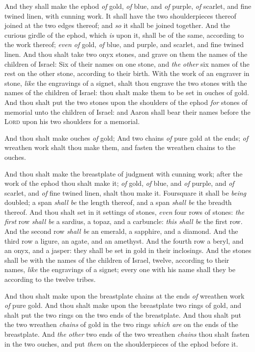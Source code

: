 \documentclass[11pt,letterpaper,oneside]{memoir}
\begin{document}
And they shall make the ephod \emph{of} gold, \emph{of} blue, and
\emph{of} purple, \emph{of} scarlet, and fine twined linen, with cunning
work. It shall have the two shoulderpieces thereof joined at the two
edges thereof; and \emph{so} it shall be joined together. And the
curious girdle of the ephod, which \emph{is} upon it, shall be of the
same, according to the work thereof; \emph{even of} gold, \emph{of}
blue, and purple, and scarlet, and fine twined linen. And thou shalt
take two onyx stones, and grave on them the names of the children of
Israel: Six of their names on one stone, and \emph{the other} six names
of the rest on the other stone, according to their birth. With the work
of an engraver in stone, \emph{like} the engravings of a signet, shalt
thou engrave the two stones with the names of the children of Israel:
thou shalt make them to be set in ouches of gold. And thou shalt put the
two stones upon the shoulders of the ephod \emph{for} stones of memorial
unto the children of Israel: and Aaron shall bear their names before the
\textsc{Lord} upon his two shoulders for a memorial.

And thou shalt make ouches \emph{of} gold; And two chains \emph{of} pure
gold at the ends; \emph{of} wreathen work shalt thou make them, and
fasten the wreathen chains to the ouches.

And thou shalt make the breastplate of judgment with cunning work; after
the work of the ephod thou shalt make it; \emph{of} gold, \emph{of}
blue, and \emph{of} purple, and \emph{of} scarlet, and \emph{of} fine
twined linen, shalt thou make it. Foursquare it shall be \emph{being}
doubled; a span \emph{shall be} the length thereof, and a span
\emph{shall be} the breadth thereof. And thou shalt set in it settings
of stones, \emph{even} four rows of stones: \emph{the first} row
\emph{shall be} a sardius, a topaz, and a carbuncle: \emph{this shall
be} the first row. And the second row \emph{shall be} an emerald, a
sapphire, and a diamond. And the third row a ligure, an agate, and an
amethyst. And the fourth row a beryl, and an onyx, and a jasper: they
shall be set in gold in their inclosings. And the stones shall be with
the names of the children of Israel, twelve, according to their names,
\emph{like} the engravings of a signet; every one with his name shall
they be according to the twelve tribes.

And thou shalt make upon the breastplate chains at the ends \emph{of}
wreathen work \emph{of} pure gold. And thou shalt make upon the
breastplate two rings of gold, and shalt put the two rings on the two
ends of the breastplate. And thou shalt put the two wreathen
\emph{chains} of gold in the two rings \emph{which are} on the ends of
the breastplate. And \emph{the other} two ends of the two wreathen
\emph{chains} thou shalt fasten in the two ouches, and put \emph{them}
on the shoulderpieces of the ephod before it.
\end{document}
